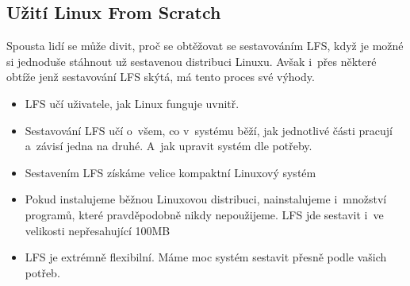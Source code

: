 \documentclass[a4paper,12pt]{article}
\begin{document}
\subsection{Užití Linux From Scratch}
Spousta lidí se může divit, proč se obtěžovat se sestavováním LFS, když je možné si jednoduše stáhnout už sestavenou distribuci Linuxu. Avšak i~přes některé obtíže jenž sestavování LFS skýtá, má tento proces své výhody.~\cite{LFS}


\begin{itemize}
 \item LFS učí uživatele, jak Linux funguje uvnitř.


 \item Sestavování LFS učí o~všem, co v~systému běží, jak jednotlivé části pracují a~závisí jedna na druhé. A~jak upravit systém dle potřeby.


 \item Sestavením LFS získáme velice kompaktní Linuxový systém


 \item Pokud instalujeme běžnou Linuxovou distribuci, nainstalujeme i~množství programů, které pravděpodobně nikdy nepoužijeme. LFS jde sestavit i~ve velikosti nepřesahující 100MB


\item LFS je extrémně flexibilní. Máme moc systém sestavit přesně podle vašich potřeb.


\end{itemize}
\end{document}
